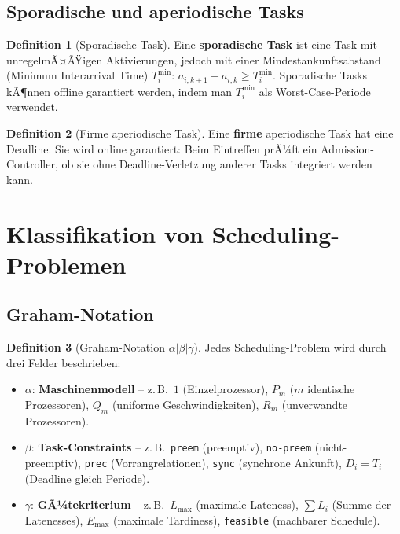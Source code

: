 ﻿\documentclass[a4paper,12pt]{report}
\theoremstyle{definition}
\newtheorem{definition}{Definition}[chapter]
\begin{document}
\subsection{Sporadische und aperiodische Tasks}

\begin{definition}[Sporadische Task]
	Eine \textbf{sporadische Task} ist eine Task mit unregelmÃ¤ÃŸigen Aktivierungen,
	jedoch mit einer Mindestankunftsabstand (Minimum Interarrival Time) $T_i^{\min}$:
	$a_{i,k+1} - a_{i,k} \geq T_i^{\min}$. Sporadische Tasks kÃ¶nnen offline
	garantiert werden, indem man $T_i^{\min}$ als Worst-Case-Periode verwendet.
\end{definition}

\begin{definition}[Firme aperiodische Task]
	Eine \textbf{firme} aperiodische Task hat eine Deadline. Sie wird online
	garantiert: Beim Eintreffen prÃ¼ft ein Admission-Controller, ob sie ohne
	Deadline-Verletzung anderer Tasks integriert werden kann.
\end{definition}

\section{Klassifikation von Scheduling-Problemen}

\subsection{Graham-Notation}

\begin{definition}[Graham-Notation $\alpha|\beta|\gamma$]
	Jedes Scheduling-Problem wird durch drei Felder beschrieben:
	\begin{itemize}
		\item $\alpha$: \textbf{Maschinenmodell} -- z.\,B.\ $1$ (Einzelprozessor),
		      $P_m$ ($m$ identische Prozessoren), $Q_m$ (uniforme Geschwindigkeiten),
		      $R_m$ (unverwandte Prozessoren).
		\item $\beta$: \textbf{Task-Constraints} -- z.\,B.\ \texttt{preem} (preemptiv),
		      \texttt{no-preem} (nicht-preemptiv), \texttt{prec} (Vorrangrelationen),
		      \texttt{sync} (synchrone Ankunft), $D_i = T_i$ (Deadline gleich Periode).
		\item $\gamma$: \textbf{GÃ¼tekriterium} -- z.\,B.\ $L_{\max}$ (maximale Lateness),
		      $\sum L_i$ (Summe der Latenesses), $E_{\max}$ (maximale Tardiness),
		      \texttt{feasible} (machbarer Schedule).
	\end{itemize}
\end{definition}
\end{document}
